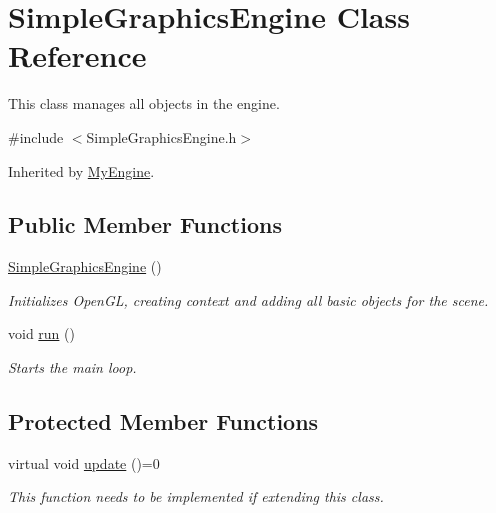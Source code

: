 \hypertarget{class_simple_graphics_engine}{\section{Simple\-Graphics\-Engine Class Reference}
\label{class_simple_graphics_engine}
}


This class manages all objects in the engine.  




{\ttfamily \#include $<$Simple\-Graphics\-Engine.\-h$>$}



Inherited by \hyperlink{class_my_engine}{My\-Engine}.

\subsection*{Public Member Functions}
\begin{DoxyCompactItemize}
\item 
\hypertarget{class_simple_graphics_engine_a72a203efddb9de2543706a6ac037a487}{\hyperlink{class_simple_graphics_engine_a72a203efddb9de2543706a6ac037a487}{Simple\-Graphics\-Engine} ()}\label{class_simple_graphics_engine_a72a203efddb9de2543706a6ac037a487}

\begin{DoxyCompactList}\small\item\em Initializes Open\-G\-L, creating context and adding all basic objects for the scene. \end{DoxyCompactList}\item 
\hypertarget{class_simple_graphics_engine_a857af6bd149195cb36f20d7e4454de60}{void \hyperlink{class_simple_graphics_engine_a857af6bd149195cb36f20d7e4454de60}{run} ()}\label{class_simple_graphics_engine_a857af6bd149195cb36f20d7e4454de60}

\begin{DoxyCompactList}\small\item\em Starts the main loop. \end{DoxyCompactList}\end{DoxyCompactItemize}
\subsection*{Protected Member Functions}
\begin{DoxyCompactItemize}
\item 
\hypertarget{class_simple_graphics_engine_a0817cafcd579cc2bc37447cd6b78d265}{virtual void \hyperlink{class_simple_graphics_engine_a0817cafcd579cc2bc37447cd6b78d265}{update} ()=0}\label{class_simple_graphics_engine_a0817cafcd579cc2bc37447cd6b78d265}

\begin{DoxyCompactList}\small\item\em This function needs to be implemented if extending this class. \end{DoxyCompactList}\end{DoxyCompactItemize}
